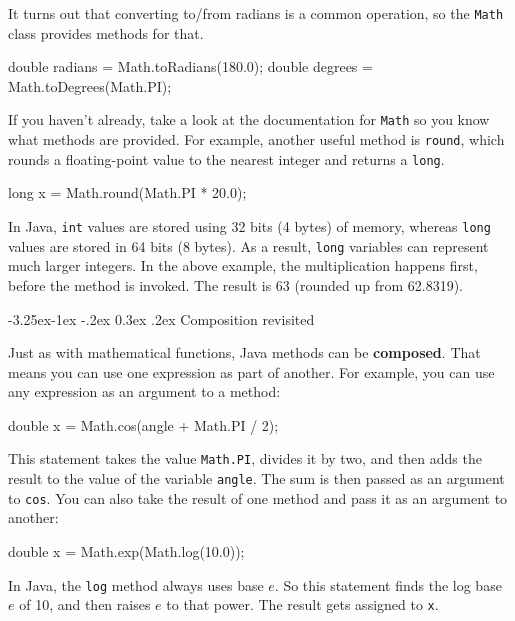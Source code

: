 \documentclass[12pt]{book}
\makeatletter
\theoremstyle{exercise}
\newcommand{\java}[1]{\verb"#1"}
\renewcommand\subsection{\@startsection{subsection}{2}{\z@}%
    {-3.25ex\@plus -1ex \@minus -.2ex}%
    {0.3ex \@plus .2ex}%
    {\normalfont\large\bfseries}}
\newcommand{\java}[1]{\lstinline{#1}} %
\makeatother
\begin{document}
It turns out that converting to/from radians is a common operation, so the \java{Math} class provides methods for that.

\begin{code}
    double radians = Math.toRadians(180.0);
    double degrees = Math.toDegrees(Math.PI);
\end{code}


If you haven't already, take a look at the documentation for \java{Math} so you know what methods are provided.
For example, another useful method is \java{round}, which rounds a floating-point value to the nearest integer and returns a \java{long}.

\begin{code}
    long x = Math.round(Math.PI * 20.0);
\end{code}

In Java, \java{int} values are stored using 32 bits (4 bytes) of memory, whereas \java{long} values are stored in 64 bits (8 bytes).
As a result, \java{long} variables can represent much larger integers.
In the above example, the multiplication happens first, before the method is invoked.
The result is 63 (rounded up from 62.8319).

\subsection{Composition revisited}


Just as with mathematical functions, Java methods can be {\bf composed}.
That means you can use one expression as part of another.
For example, you can use any expression as an argument to a method:

\begin{code}
    double x = Math.cos(angle + Math.PI / 2);
\end{code}

This statement takes the value \java{Math.PI}, divides it by two, and then adds the result to the value of the variable \java{angle}.
The sum is then passed as an argument to \java{cos}.
You can also take the result of one method and pass it as an argument to another:

\begin{code}
    double x = Math.exp(Math.log(10.0));
\end{code}

In Java, the \java{log} method always uses base $e$.
So this statement finds the log base $e$ of 10, and then raises $e$ to that power.
The result gets assigned to \java{x}.
\end{document}
